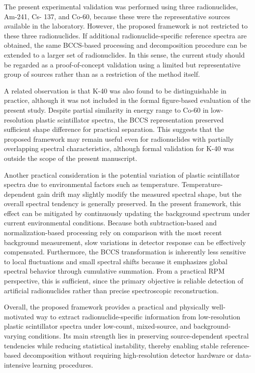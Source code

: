 \documentclass[10pt]{wlscirep}
\begin{document}
The present experimental validation was performed using three radionuclides, Am-241, Cs- 137, and Co-60, because these were the representative sources available in the laboratory. However, the proposed framework is not restricted to these three radionuclides. If additional radionuclide-specific reference spectra are obtained, the same BCCS-based processing and decomposition procedure can be extended to a larger set of radionuclides. In this sense, the current study should be regarded as a proof-of-concept validation using a limited but representative group of sources rather than as a restriction of the method itself.

A related observation is that K-40 was also found to be distinguishable in practice, although it was not included in the formal figure-based evaluation of the present study. Despite partial similarity in energy range to Co-60 in low-resolution plastic scintillator spectra, the BCCS representation preserved sufficient shape difference for practical separation. This suggests that the proposed framework may remain useful even for radionuclides with partially overlapping spectral characteristics, although formal validation for K-40 was outside the scope of the present manuscript.

Another practical consideration is the potential variation of plastic scintillator spectra due to environmental factors such as temperature. Temperature-dependent gain drift may slightly modify the measured spectral shape, but the overall spectral tendency is generally preserved. In the present framework, this effect can be mitigated by continuously updating the background spectrum under current environmental conditions. Because both subtraction-based and normalization-based processing rely on comparison with the most recent background measurement, slow variations in detector response can be effectively compensated. Furthermore, the BCCS transformation is inherently less sensitive to local fluctuations and small spectral shifts because it emphasizes global spectral behavior through cumulative summation. From a practical RPM perspective, this is sufficient, since the primary objective is reliable detection of artificial radionuclides rather than precise spectroscopic reconstruction.

Overall, the proposed framework provides a practical and physically well-motivated way to extract radionuclide-specific information from low-resolution plastic scintillator spectra under low-count, mixed-source, and background-varying conditions. Its main strength lies in preserving source-dependent spectral tendencies while reducing statistical instability, thereby enabling stable reference-based decomposition without requiring high-resolution detector hardware or data-intensive learning procedures.
\end{document}
